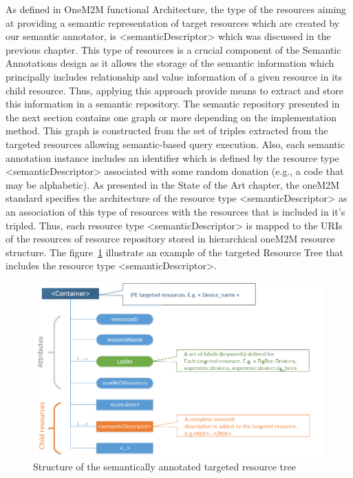 As defined in OneM2M functional Architecture, the type of the resources aiming at providing a semantic representation of target resources which are created by our semantic annotator, is <semanticDescriptor> which was discussed in the previous chapter. This type of resources is a crucial component of the Semantic Annotations design as it allows the storage of the semantic information which principally includes relationship and value information of a given resource in its child resource. Thus, applying this approach provide means to extract and store this information in a semantic repository. The semantic repository presented in the next section contains one graph or more depending on the implementation method. This graph is constructed from the set of triples extracted from the targeted resources allowing semantic-based query execution. Also, each semantic annotation instance includes an identifier which is defined by the resource type <semanticDescriptor> associated with some random donation (e.g., a code that may be alphabetic). As presented in the State of the Art chapter, the oneM2M standard specifies the architecture of the resource type <semanticDescriptor> as an association of this type of resources with the resources that is included in it's tripled. Thus, each resource type <semanticDescriptor> is mapped to the URIs of the resources of resource repository stored in hierarchical oneM2M resource structure.  The figure~\ref{fig:contrib2:example} illustrate an example of the targeted Resource Tree that includes the resource type <semanticDescriptor>.\par
\begin{figure}[htbp]
    \centering
    \includegraphics[width=1.1\textwidth]{resources/images/sdlabel}
    \caption{Structure of the semantically annotated targeted resource tree }\label{fig:contrib2:example}
\end{figure}

